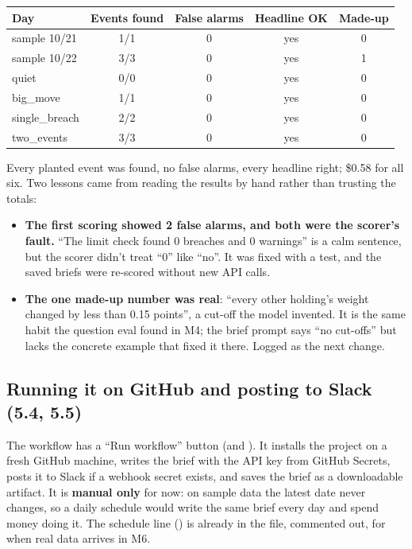 \documentclass[11pt]{article}
\newcommand{\code}[1]{\texttt{\detokenize{#1}}}
\begin{document}
\begin{center}
\begin{tabular}{@{}lcccc@{}}
\toprule
\textbf{Day} & \textbf{Events found} & \textbf{False alarms} & \textbf{Headline OK} & \textbf{Made-up} \\
\midrule
sample 10/21   & 1/1 & 0 & yes & 0 \\
sample 10/22   & 3/3 & 0 & yes & 1 \\
quiet          & 0/0 & 0 & yes & 0 \\
big\_move      & 1/1 & 0 & yes & 0 \\
single\_breach & 2/2 & 0 & yes & 0 \\
two\_events    & 3/3 & 0 & yes & 0 \\
\bottomrule
\end{tabular}
\end{center}

Every planted event was found, no false alarms, every headline right; \$0.58 for all six. Two
lessons came from reading the results by hand rather than trusting the totals:

\begin{itemize}
  \item \textbf{The first scoring showed 2 false alarms, and both were the scorer's fault.}
        ``The limit check found 0 breaches and 0 warnings'' is a calm sentence, but the
        scorer didn't treat ``0'' like ``no''. It was fixed with a test, and the saved briefs
        were re-scored without new API calls.
  \item \textbf{The one made-up number was real}: ``every other holding's weight changed by less
        than 0.15 points'', a cut-off the model invented. It is the same habit the question
        eval found in M4; the brief prompt says ``no cut-offs'' but lacks the concrete example
        that fixed it there. Logged as the next change.
\end{itemize}

\subsection{Running it on GitHub and posting to Slack (5.4, 5.5)}

The workflow has a ``Run workflow'' button (and \code{gh workflow run}). It installs the
project on a fresh GitHub machine, writes the brief with the API key from GitHub Secrets,
posts it to Slack if a webhook secret exists, and saves the brief as a downloadable artifact.
It is \textbf{manual only} for now: on sample data the latest date never changes, so a daily
schedule would write the same brief every day and spend money doing it. The schedule line
(\code{0 12 * * 1-5}) is already in the file, commented out, for when real data arrives in M6.
\end{document}
